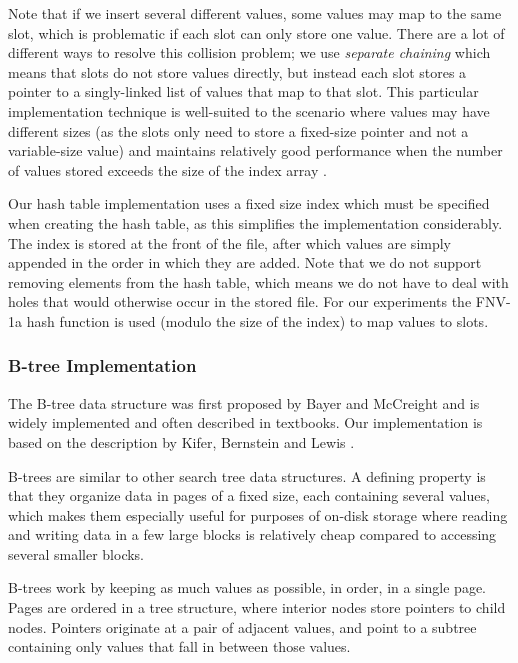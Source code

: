 \documentclass{acm_proc_article-sp}
\begin{document}
Note that if we insert several different values, some values may map to the
same slot, which is problematic if each slot can only store one value. There
are a lot of different ways to resolve this collision problem; we use
\emph{separate chaining} which means that slots do not store values directly,
but instead each slot stores a pointer to a singly-linked list of values that
map to that slot. This particular implementation technique is well-suited to
the scenario where values may have different sizes (as the slots only need to
store a fixed-size pointer and not a variable-size value) and maintains
relatively good performance when the number of values stored exceeds the size
of the index array \cite{sedgewick1998ac}.


Our hash table implementation uses a fixed size index which must be specified
when creating the hash table, as this simplifies the implementation
considerably. The index is stored at the front of the file, after which values
are simply appended in the order in which they are added. Note that we do not
support removing elements from the hash table, which means we do not have to
deal with holes that would otherwise occur in the stored file. For our
experiments the FNV-1a hash function \cite{noll2004fnv} is used (modulo the
size of the index) to map values to slots.

\subsubsection{B-tree Implementation}
The B-tree data structure was first proposed by Bayer and McCreight
\cite{bayer1970oam} and is widely implemented and often described in
textbooks. Our implementation is based on the description by Kifer, Bernstein
and Lewis \cite{kifer2006dsa}.

B-trees are similar to other search tree data structures. A defining property
is that they organize data in pages of a fixed size, each containing several
values, which makes them especially useful for purposes of on-disk storage
where reading and writing data in a few large blocks is relatively cheap
compared to accessing several smaller blocks.

B-trees work by keeping as much values as possible, in order, in a single
page. Pages are ordered in a tree structure, where interior nodes store
pointers to child nodes. Pointers originate at a pair of adjacent values,
and point to a subtree containing only values that fall in between those
values.
\end{document}
